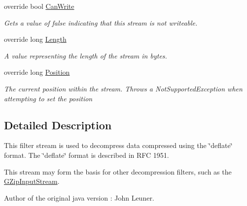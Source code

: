 \begin{DoxyCompactItemize}
override bool \hyperlink{class_i_c_sharp_code_1_1_sharp_zip_lib_1_1_zip_1_1_compression_1_1_streams_1_1_inflater_input_stream_ae3e27d013e177075c3af2116db5f4a2a}{Can\+Write}
\begin{DoxyCompactList}\small\item\em Gets a value of false indicating that this stream is not writeable. \end{DoxyCompactList}\item 
override long \hyperlink{class_i_c_sharp_code_1_1_sharp_zip_lib_1_1_zip_1_1_compression_1_1_streams_1_1_inflater_input_stream_a4fca96ec46a755bf99c0ac771513a359}{Length}
\begin{DoxyCompactList}\small\item\em A value representing the length of the stream in bytes. \end{DoxyCompactList}\item 
override long \hyperlink{class_i_c_sharp_code_1_1_sharp_zip_lib_1_1_zip_1_1_compression_1_1_streams_1_1_inflater_input_stream_a2134ebd177f2a8042123281cfc6f472d}{Position}
\begin{DoxyCompactList}\small\item\em The current position within the stream. Throws a Not\+Supported\+Exception when attempting to set the position \end{DoxyCompactList}\end{DoxyCompactItemize}


\subsection{Detailed Description}
This filter stream is used to decompress data compressed using the \char`\"{}deflate\char`\"{} format. The \char`\"{}deflate\char`\"{} format is described in R\+FC 1951. 

This stream may form the basis for other decompression filters, such as the \hyperlink{class_i_c_sharp_code_1_1_sharp_zip_lib_1_1_g_zip_1_1_g_zip_input_stream}{G\+Zip\+Input\+Stream}.

Author of the original java version \+: John Leuner. 

